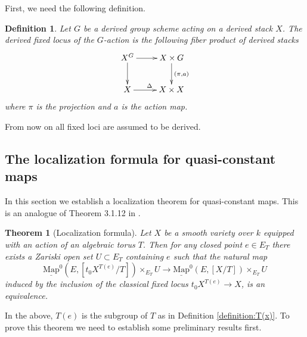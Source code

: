 \documentclass[11pt,letterpaper]{amsart}
\newtheorem{theorem}[dummy]{Theorem}
\newtheorem{definition}[dummy]{Definition}
\newcommand{\Mapo}[2]{\underline{\mathrm{Map}}^{0}\left (#1,#2\right )}
\begin{document}
First, we need the following definition.
\begin{definition}
Let $G$ be a derived group scheme acting on a derived stack $X$. The \emph{derived fixed locus} of the $G$-action  is the following fiber product of derived stacks 
$$
\xymatrix{
X^G \ar[r] \ar[d] & X\times G \ar[d]^{(\pi,a)} \\
X \ar[r]^{\Delta}  & X\times X} 
$$
where $\pi$ is the projection and $a$ is the action map. 
\end{definition}
From now on all fixed loci are assumed to be derived. 

\subsection{The localization formula for quasi-constant maps}\label{subsection:locformula}
In this section we establish a localization theorem for quasi-constant maps. This is an analogue of Theorem 3.1.12 in \cite{HChen}. 

\begin{theorem}[Localization formula]\label{proposition:localization}
Let $X$ be a smooth variety over $k$ equipped with an action of an algebraic torus $T$. Then for any closed point $e\in E_T$ there exists a Zariski open set $U\subset E_T$ containing $e$ such that the natural map
\begin{equation}\label{eq:locmap}
\Mapo{E}{[t_0 X^{T(e)}/T]}\times_{E_T} U\rightarrow\Mapo{E}{[X/T]}\times_{E_T} U
\end{equation}
induced by the inclusion of the classical fixed locus $t_0 X^{T(e)}\rightarrow X$, is an equivalence. 
\end{theorem}
In the above, $T(e)$ is the subgroup of $T$ as in Definition \ref{definition:T(x)}.
To prove this theorem we need to establish some preliminary results first.
\end{document}
